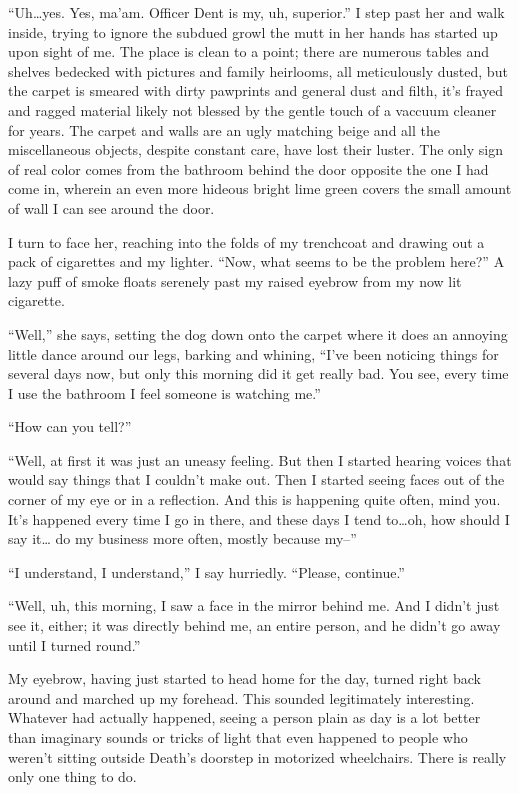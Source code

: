 ``Uh\ldots yes. Yes, ma'am. Officer Dent is my, uh, superior.'' I step past
her and walk inside, trying to ignore the subdued growl the mutt in her
hands has started up upon sight of me. The place is clean to a point;
there are numerous tables and shelves bedecked with pictures and family
heirlooms, all meticulously dusted, but the carpet is smeared with dirty
pawprints and general dust and filth, it's frayed and ragged material
likely not blessed by the gentle touch of a vaccuum cleaner for
years. The carpet and walls are an ugly matching beige and all the
miscellaneous objects, despite constant care, have lost their
luster. The only sign of real color comes from the bathroom behind the
door opposite the one I had come in, wherein an even more hideous bright
lime green covers the small amount of wall I can see around the door.

I turn to face her, reaching into the folds of my trenchcoat and drawing
out a pack of cigarettes and my lighter. ``Now, what seems to be the
problem here?'' A lazy puff of smoke floats serenely past my raised
eyebrow from my now lit cigarette.

``Well,'' she says, setting the dog down onto the carpet where it does an
annoying little dance around our legs, barking and whining, ``I've been
noticing things for several days now, but only this morning did it get
really bad. You see, every time I use the bathroom I feel someone is
watching me.''

``How can you tell?''

``Well, at first it was just an uneasy feeling. But then I started
hearing voices that would say things that I couldn't make out. Then I
started seeing faces out of the corner of my eye or in a reflection. And
this is happening quite often, mind you. It's happened every time I go
in there, and these days I tend to\ldots oh, how should I say it\ldots
do my business more often, mostly because my--''

``I understand, I understand,'' I say hurriedly. ``Please, continue.''

``Well, uh, this morning, I saw a face in the mirror behind me. And I
didn't just see it, either; it was directly behind me, an entire person,
and he didn't go away until I turned round.''

My eyebrow, having just started to head home for the day, turned
right back around and marched up my forehead. This sounded legitimately
interesting. Whatever had actually happened, seeing a person plain as
day is a lot better than imaginary sounds or tricks of light that even
happened to people who weren't sitting outside Death's doorstep in
motorized wheelchairs. There is really only one thing to do.

